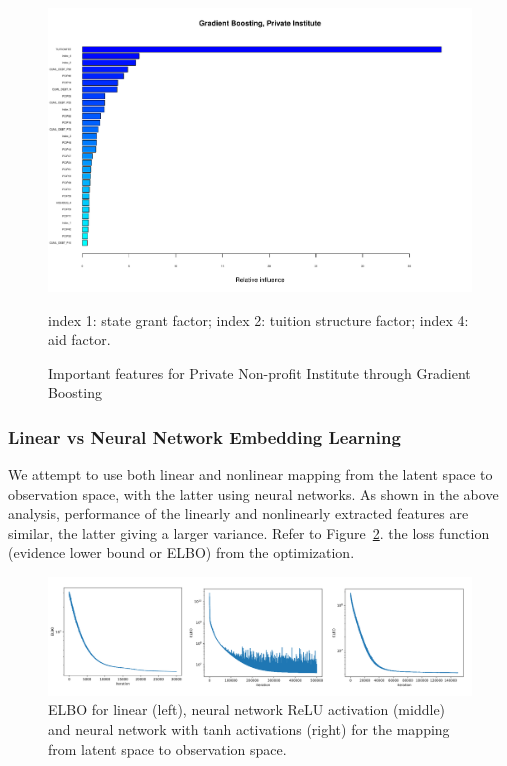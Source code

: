 \documentclass[11pt,letter]{article}
\begin{document}
\begin{figure}[H]
\begin{center}
\includegraphics[scale=0.4]{gb_private1}
\caption{Important features for Private Non-profit Institute through Gradient Boosting}\label{fig:gb_private}
\vspace{-3mm}
\begin{flushleft}\small 
\centering
index 1: state grant factor; index 2: tuition structure factor; index 4: aid factor.
\end{flushleft}
\end{center}
\end{figure}

\subsubsection{Linear vs Neural Network Embedding Learning}
We attempt to use both linear and nonlinear mapping from the latent space to observation space, with the latter using neural networks. As shown in the above analysis, performance of the linearly and nonlinearly extracted features are similar, the latter giving a larger variance. Refer to Figure~\ref{fig:elbo}. the loss function (evidence lower bound or ELBO) from the optimization. 

\begin{figure}[H]
\centering
\includegraphics[width=\linewidth]{elbo.png}
\caption{ELBO for linear (left), neural network ReLU activation (middle) and neural network with tanh activations (right) for the mapping from latent space to observation space.}\label{fig:elbo}
\end{figure}
\end{document}
